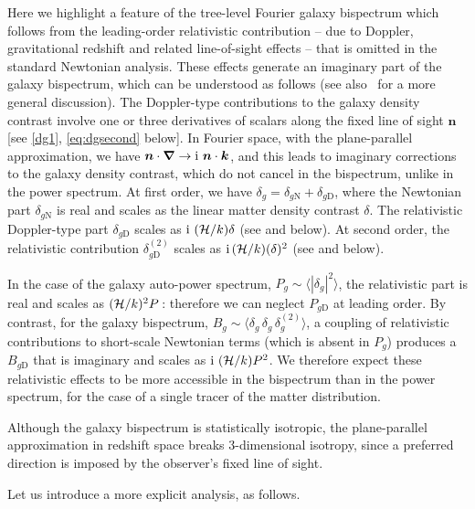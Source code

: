 Here we highlight a feature of the tree-level Fourier galaxy bispectrum which follows from the  leading-order relativistic contribution -- due to Doppler, gravitational redshift  and related line-of-sight effects -- that is omitted in the standard Newtonian analysis. These effects generate an imaginary part of the galaxy bispectrum, which can be understood as follows (see also~\cite{McDonald:2009dh,Clarkson:2018dwn,Jeong:2019igb} for a more general discussion).  
The Doppler-type contributions to the galaxy density contrast involve one or three derivatives  of scalars along the fixed line of sight $\bm n$ [see \eqref{dg1}, \eqref{eq:dgsecond} below]. In Fourier space, with the plane-parallel approximation, we have  $\bm{n}\cdot\bm{\nabla} \to {\mathrm{i\,}}\, \bm{n}\cdot\bm{k}$, and this leads to imaginary corrections to the galaxy density contrast, which do not cancel in the bispectrum, unlike in the power spectrum. At first order, we have $\delta_g=\delta_{g\mathrm{N}}+ \delta_{g\mathrm{D}}$, where the Newtonian part $\delta_{g\mathrm{N}}$ is real and scales as the linear matter density contrast $\delta$. The 
relativistic Doppler-type part $\delta_{g\mathrm{D}}$ scales as ${\mathrm{i\,}}\,(\mathcal{H}/k) \delta$  (see \cite{McDonald:2009dh, Jeong:2011as, Abramo:2017xnp,Clarkson:2018dwn} and below). At second  order, the relativistic contribution $\delta_{g\mathrm{D}}^{(2)}$ scales as ${\mathrm{i\,}}(\mathcal{H}/k) (\delta)^2$ (see \cite{Clarkson:2018dwn} and below). 


In the case of the galaxy {auto}-power spectrum, $P_g\sim \langle |\delta_g|^2\rangle$, the relativistic part is {real and scales as} $(\mathcal{H}/k)^2P$\,:  therefore we can neglect $P_{g\mathrm{D}}$ at leading order. By contrast, for the galaxy bispectrum, $B_g\sim \langle \delta_g\,\delta_g \, \delta^{(2)}_g\rangle$, a coupling of relativistic contributions to short-scale Newtonian terms (which  is absent in $P_g$) produces a $B_{g\mathrm{D}}$ that is {imaginary and scales as} ${\mathrm{i\,}}\,(\mathcal{H}/k)P^2$. 
We therefore expect these relativistic effects to be more accessible in the bispectrum than in the power spectrum, for the case of a single tracer {of the matter distribution}.

Although the galaxy bispectrum is statistically isotropic, the plane-parallel approximation in redshift space breaks 3-dimensional isotropy, since a preferred direction is imposed by the observer's fixed line of sight. 

Let us introduce a more explicit analysis, as follows.

